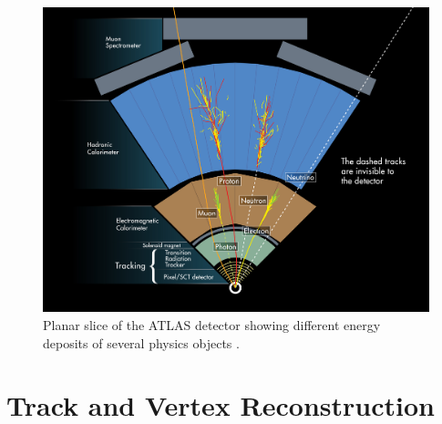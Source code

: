 \begin{figure}[h]
    \centering
    \includegraphics[scale=0.6]{figs/ch4/ATLAS-tracks.jpg}
    \caption{ Planar slice of the ATLAS detector showing different energy deposits of several physics objects \cite{atlas-detects}.}
\label{fig:4.1}
\end{figure}

\section{Track and Vertex Reconstruction}\label{sec:track-reco}

